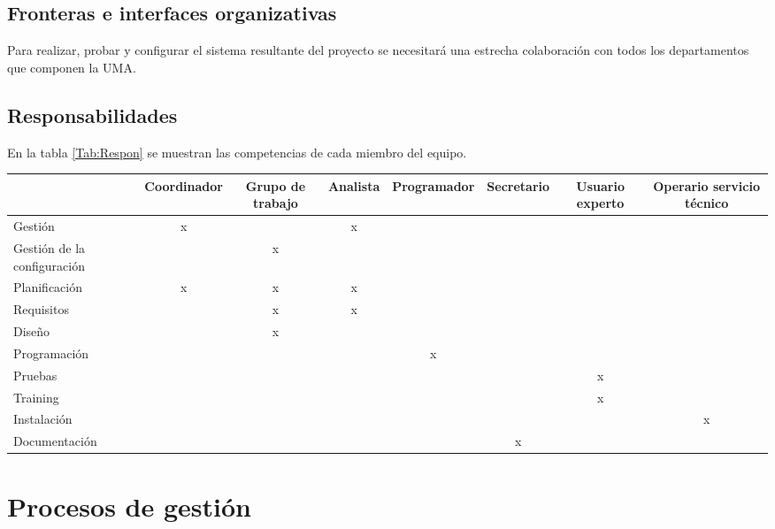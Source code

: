 \documentclass[11pt,a4paper,spanish,twoside]{report}
\begin{document}
\section{Fronteras e interfaces organizativas}
Para realizar, probar y configurar el sistema resultante del proyecto se 
necesitará una estrecha colaboración con todos los departamentos que componen 
la UMA. 

\section{Responsabilidades}
En la tabla \ref{Tab:Respon} se muestran las competencias de cada miembro del
equipo.
\begin{sidewaystable}[!h]
  \centering
  \scriptsize
  \begin{tabular}{l|c|c|c|c|c|c|c}
    & \textbf{Coordinador} & \textbf{Grupo de trabajo} &
    \textbf{Analista} & \textbf{Programador} & \textbf{Secretario} &
    \textbf{Usuario experto} & \textbf{Operario servicio técnico}\\
    \hline \hline
    Gestión                     & x &   & x &   &   &   &    \\ 
    \hline
    Gestión de la configuración &   & x &   &   &   &   &    \\
    \hline
    Planificación               & x & x & x &   &   &   &    \\
    \hline
    Requisitos                  &   & x & x &   &   &   &    \\
    \hline
    Diseño                      &   & x &   &   &   &   &    \\
    \hline
    Programación                &   &   &   & x &   &   &    \\
    \hline
    Pruebas                     &   &   &   &   &   & x &    \\
    \hline
    Training                    &   &   &   &   &   & x &    \\
    \hline
    Instalación                 &   &   &   &   &   &   & x  \\
    \hline
    Documentación               &   &   &   &   & x &   &    \\
    \hline
  \end{tabular}
  \caption{Responsabilidades de los miembros} \label{Tab:Respon}
\end{sidewaystable}

\chapter{Procesos de gestión}
\end{document}
